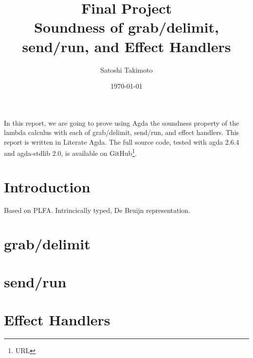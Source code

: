 \documentclass[a4paper,11pt]{article}
\title{{\large{Final Project}}\\Soundness of grab/delimit, send/run, and Effect Handlers}
\date{\today}
\author{Satoshi Takimoto}
\begin{document}
\maketitle

In this report, we are going to prove using Agda the soundness property of the lambda calculus with each of grab/delimit, send/run, and effect handlers.
This report is written in Literate Agda. The full source code, tested with agda 2.6.4 and agda-stdlib 2.0, is available on GitHub\footnote[1]{URL}.

\section{Introduction}

Based on PLFA\cite{plfa22.08}. Intrincically typed, De Bruijn representation.

\section{grab/delimit}



\section{send/run}

\section{Effect Handlers}



\end{document}
